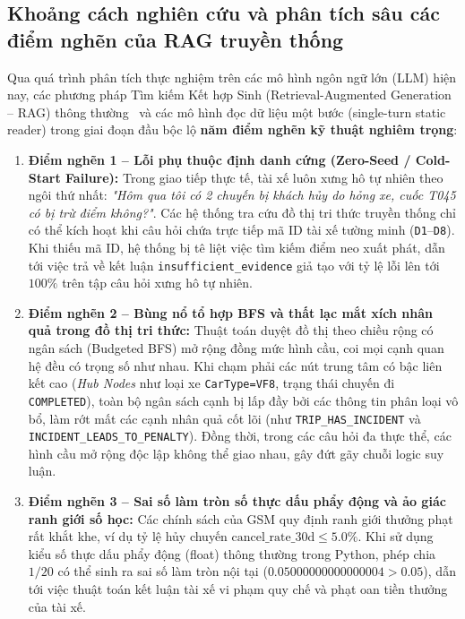 \documentclass[a4paper,11pt]{article}
\begin{document}
\subsection{Khoảng cách nghiên cứu và phân tích sâu các điểm nghẽn của RAG truyền thống}
Qua quá trình phân tích thực nghiệm trên các mô hình ngôn ngữ lớn (LLM) hiện nay, các phương pháp Tìm kiếm Kết hợp Sinh (Retrieval-Augmented Generation -- RAG) thông thường~\cite{lewis2020rag} và các mô hình đọc dữ liệu một bước (single-turn static reader) trong giai đoạn đầu bộc lộ \textbf{năm điểm nghẽn kỹ thuật nghiêm trọng}:
\begin{enumerate}[leftmargin=1.8em,topsep=2pt]
    \item \textbf{Điểm nghẽn 1 -- Lỗi phụ thuộc định danh cứng (Zero-Seed / Cold-Start Failure):}
    Trong giao tiếp thực tế, tài xế luôn xưng hô tự nhiên theo ngôi thứ nhất: \textit{"Hôm qua tôi có 2 chuyến bị khách hủy do hỏng xe, cuốc T045 có bị trừ điểm không?"}. Các hệ thống tra cứu đồ thị tri thức truyền thống chỉ có thể kích hoạt khi câu hỏi chứa trực tiếp mã ID tài xế tường minh (\texttt{D1}--\texttt{D8}). Khi thiếu mã ID, hệ thống bị tê liệt việc tìm kiếm điểm neo xuất phát, dẫn tới việc trả về kết luận \texttt{insufficient\_evidence} giả tạo với tỷ lệ lỗi lên tới $100\%$ trên tập câu hỏi xưng hô tự nhiên.
    \item \textbf{Điểm nghẽn 2 -- Bùng nổ tổ hợp BFS và thất lạc mắt xích nhân quả trong đồ thị tri thức:}
    Thuật toán duyệt đồ thị theo chiều rộng có ngân sách (Budgeted BFS) mở rộng đồng mức hình cầu, coi mọi cạnh quan hệ đều có trọng số như nhau. Khi chạm phải các nút trung tâm có bậc liên kết cao (\textit{Hub Nodes} như loại xe \texttt{CarType=VF8}, trạng thái chuyến đi \texttt{COMPLETED}), toàn bộ ngân sách cạnh bị lấp đầy bởi các thông tin phân loại vô bổ, làm rớt mất các cạnh nhân quả cốt lõi (như \texttt{TRIP\_HAS\_INCIDENT} và \texttt{INCIDENT\_LEADS\_TO\_PENALTY}). Đồng thời, trong các câu hỏi đa thực thể, các hình cầu mở rộng độc lập không thể giao nhau, gây đứt gãy chuỗi logic suy luận.
    \item \textbf{Điểm nghẽn 3 -- Sai số làm tròn số thực dấu phẩy động và ảo giác ranh giới số học:}
    Các chính sách của GSM quy định ranh giới thưởng phạt rất khắt khe, ví dụ tỷ lệ hủy chuyến $\text{cancel\_rate\_30d} \le 5.0\%$. Khi sử dụng kiểu số thực dấu phẩy động (float) thông thường trong Python, phép chia $1/20$ có thể sinh ra sai số làm tròn nội tại ($0.05000000000000004 > 0.05$), dẫn tới việc thuật toán kết luận tài xế vi phạm quy chế và phạt oan tiền thưởng của tài xế.

\end{enumerate}
\end{document}
